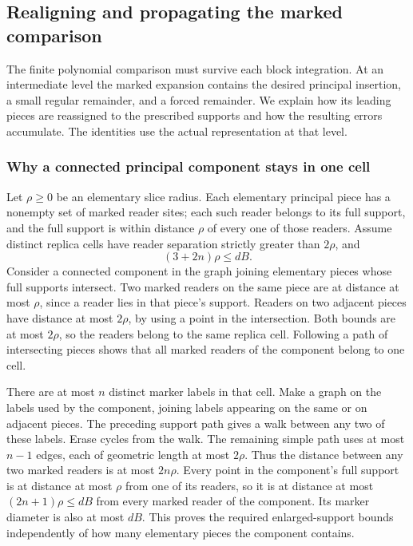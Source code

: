 \subsection{Realigning and propagating the marked comparison}
\label{sec:allarity-marked-propagation}

The finite polynomial comparison must survive each block integration.
At an intermediate level the marked expansion contains the desired
principal insertion, a small regular remainder, and a forced remainder.
We explain how its leading pieces are reassigned to the prescribed
supports and how the resulting errors accumulate. The identities use
the actual representation at that level.

\subsubsection{Why a connected principal component stays in one cell}

Let $\rho\ge0$ be an elementary slice radius. Each elementary principal
piece has a nonempty set of marked reader sites; each such reader belongs
to its full support, and the full support is within distance $\rho$ of
every one of those readers. Assume distinct
replica cells have reader separation strictly greater than $2\rho$, and
\[
                  (3+2n)\rho\le dB.
\]
Consider a connected component in the graph joining elementary pieces
whose full supports intersect. Two marked readers on the same piece
are at distance at most $\rho$, since a reader lies in that piece's
support. Readers on two adjacent pieces have distance at most
$2\rho$, by using a point in the intersection. Both bounds are at most
$2\rho$, so the readers belong to the same replica cell. Following a
path of intersecting pieces shows that all marked readers of the
component belong to one cell.

There are at most $n$ distinct marker labels in that cell. Make a graph
on the labels used by the component, joining labels appearing on the
same or on adjacent pieces. The preceding support path gives a walk
between any two of these labels. Erase cycles from the walk. The
remaining simple path uses at most $n-1$ edges, each of geometric
length at most $2\rho$. Thus the distance between any two marked
readers is at most $2n\rho$. Every point in the component's full
support is at distance at most $\rho$ from one of its readers, so
it is at distance at most $(2n+1)\rho\le dB$ from every marked
reader of the component. Its marker diameter is also at most $dB$.
This proves the required enlarged-support bounds independently of
how many elementary pieces the component contains.

